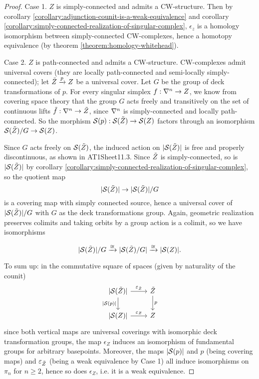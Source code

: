 \begin{proof}
Case 1. $Z$ is simply-connected and admits a CW-structure. Then by corollary \ref{corollary:adjunction-counit-is-a-weak-equivalence} and corollary \ref{corollary:simply-connected-realization-of-singular-complex}, $\epsilon_z$ is a homology isomorphism between simply-connected CW-complexes, hence a homotopy equivalence (by theorem \ref{theorem:homology-whitehead}).

Case 2. $Z$ is path-connected and admits a CW-structure. CW-complexes admit universal covers (they are locally path-connected and semi-locally simply-connected); let $\til Z\xto{p}Z$ be a universal cover. Let $G$ be the group of deck transformations of $p$. For every singular simplex $f:\ns\to Z$, we know from covering space theory that the group $G$ acts freely and transitively on the set of continuous lifts $\til f:\ns\to \til Z$, since $\ns$ is simply-connected and locally path-connected. So the morphism $\S(p):\S(\til Z)\to\S(Z)$ factors through an isomorphism $\S(\til Z)/G\to\S(Z)$.

Since $G$ acts freely on $\S(\til Z)$, the induced action on $|\S(\til Z)|$ is free and properly discontinuous, as shown in AT1Sheet11.3. Since $\til Z$ is simply-connected, so is $|\S(\til Z)|$ by corollary \ref{corollary:simply-connected-realization-of-singular-complex}, so the quotient map
\[|\S(\til Z)|\to|\S(\til Z)|/G\]
is a covering map with simply connected source, hence a universal cover of $|\S(\til Z)|/G$ with $G$ as the deck transformations group. Again, geometric realization preserves colimits and taking orbits by a group action is a colimit, so we have isomorphisms

\[|\S(\til Z)|/G\xto{\cong}|\S(\til Z)/G|\xto{\cong}|\S(Z)|.\]

To sum up: in the commutative square of spaces (given by naturality of the counit)
\[
\begin{tikzcd}
{|\S(\til Z)|} \ar[d,"{|\S(p)|}"'] \ar[r,"\epsilon_{\til Z}"] & \til Z \ar[d,"p"]\\
{|\S(Z)|} \ar[r,"\epsilon_Z"] & Z
\end{tikzcd}
\]
since both vertical maps are universal coverings with isomorphic deck transformation groups, the map $\epsilon_Z$ induces an isomorphism of fundamental groups for arbitrary basepoints. Moreover, the maps $|\S(p)|$ and $p$ (being covering maps) and $\epsilon_{\til Z}$ (being a weak equivalence by Case 1) all induce isomorphisms on $\pi_n$ for $n\ge2$, hence so does $\epsilon_Z$, i.e. it is a weak equivalence.


\end{proof}
